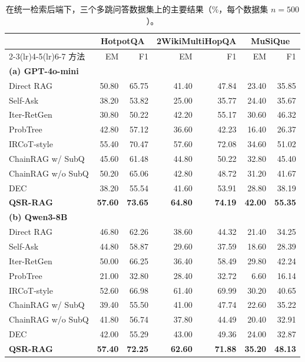 \documentclass[11pt]{article}
\begin{document}
	\begin{table}[t]
		\centering
		\caption{在统一检索后端下，三个多跳问答数据集上的主要结果（\%，每个数据集 $n=500$）。}
		\label{tab:main-results}
		\small
		\setlength{\tabcolsep}{4.2pt}
		\begin{tabular}{lrrrrrr}
			\toprule
			& \multicolumn{2}{c}{HotpotQA} & \multicolumn{2}{c}{2WikiMultiHopQA} & \multicolumn{2}{c}{MuSiQue}\\
			\cmidrule(lr){2-3}\cmidrule(lr){4-5}\cmidrule(lr){6-7}
			方法 & EM & F1 & EM & F1 & EM & F1\\
			\midrule
			\multicolumn{7}{l}{\textbf{(a) GPT-4o-mini}}\\
			Direct RAG          & 50.80 & 65.75 & 41.40 & 47.84 & 23.40 & 35.85\\
			Self-Ask            & 38.20 & 53.82 & 25.00 & 35.77 & 24.40 & 35.67\\
			Iter-RetGen         & 30.80 & 50.22 & 42.20 & 55.17 & 30.60 & 46.32\\
			ProbTree            & 42.80 & 57.12 & 36.60 & 42.23 & 16.40 & 26.37\\
			IRCoT-style         & 55.40 & 70.47 & 57.60 & 72.08 & 34.60 & 51.02\\
			ChainRAG w/ SubQ    & 45.60 & 61.48 & 44.80 & 50.22 & 32.80 & 45.40\\
			ChainRAG w/o SubQ   & 50.20 & 65.06 & 42.80 & 48.72 & 31.20 & 41.67\\
			DEC                 & 38.20 & 55.54 & 41.60 & 53.91 & 28.80 & 38.19\\
			\textbf{QSR-RAG}    & \textbf{57.60} & \textbf{73.65} & \textbf{64.80} & \textbf{74.19} & \textbf{42.00} & \textbf{55.35}\\
			\midrule
			\multicolumn{7}{l}{\textbf{(b) Qwen3-8B}}\\
			Direct RAG          & 46.80 & 62.26 & 38.60 & 44.32 & 21.40 & 34.25\\
			Self-Ask            & 44.80 & 58.87 & 29.60 & 37.59 & 18.60 & 28.39\\
			Iter-RetGen         & 50.00 & 66.25 & 36.40 & 58.49 & 29.80 & 42.24\\
			ProbTree            & 21.00 & 32.80 & 28.40 & 32.72 &  6.60 & 16.14\\
			IRCoT-style         & 52.60 & 66.98 & 61.40 & 69.99 & 30.20 & 40.65\\
			ChainRAG w/ SubQ    & 39.40 & 55.50 & 41.00 & 47.74 & 22.60 & 35.22\\
			ChainRAG w/o SubQ   & 41.80 & 56.74 & 37.80 & 44.49 & 20.40 & 32.91\\
			DEC                 & 42.00 & 55.29 & 43.00 & 49.36 & 24.00 & 32.87\\
			\textbf{QSR-RAG}    & \textbf{57.40} & \textbf{72.25} & \textbf{62.60} & \textbf{71.88} & \textbf{35.20} & \textbf{48.13}\\
			\bottomrule
		\end{tabular}
	\end{table}
\end{document}

